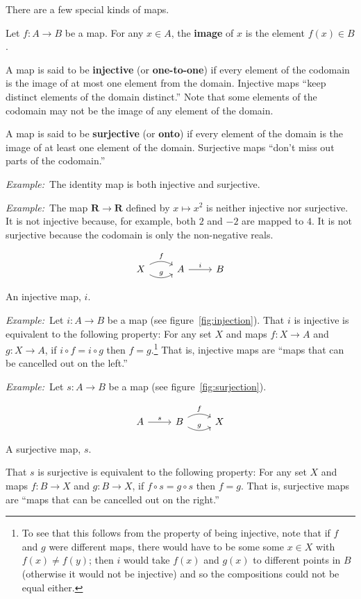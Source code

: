\documentclass[12pt, a4paper]{article}
\newcommand{\defn}[1]{\textbf{#1}}
\newcommand{\set}[1]{\mathbold{#1}}
\newcommand{\eg}{\emph{Example:}\relax}
\begin{document}
There are a few special kinds of maps. 
 
Let $f:A\to B$ be a map. For any $x\in A$, the \defn{image} of $x$ is the
element $f(x)\in B$.

A map is said to be \defn{injective} (or \defn{one-to-one}) if every
element of the codomain is the image of at most one element from the
domain. Injective maps “keep distinct elements of the domain
distinct.” Note that some elements of the codomain may not be the
image of any element of the domain.

A map is said to be \defn{surjective} (or \defn{onto}) if every
element of the domain is the image of at least one element of the
domain. Surjective maps “don't miss out parts of the codomain.”

\eg\ The identity map is both injective and surjective.

\eg\ The map $\set{R}\to\set{R}$ defined by $x\mapsto x^2$ is neither
injective nor surjective. It is not injective because, for example,
both $2$ and $-2$ are mapped to $4$. It is not surjective because the
codomain is only the non-negative reals.

\begin{sidefigure}
\[\begin{tikzcd}
  X \arrow[r, bend left, "f"] \arrow [r, bend right, "g"] & A \arrow[r, "i"] & B
\end{tikzcd}\]
  \caption{An injective map, $i$.\label{fig:injection}}
\end{sidefigure}
\eg\ Let $i\colon A\to B$ be a map (see
figure~\ref{fig:injection}). That $i$ is injective is equivalent to
the following property: For any set $X$ and maps $f\colon X\to A$ and
$g\colon X\to A$, if $i\circ f = i\circ g$ then $f = g$.\footnote{To see that
this follows from the property of being injective, note that if $f$
and $g$ were different maps, there would have to be some some $x \in X$
with $f(x)\neq f(y)$; then $i$ would take $f(x)$ and $g(x)$ to different
points in $B$ (otherwise it would not be injective) and so the
compositions could not be equal either.} That is, injective maps are
“maps that can be cancelled out on the left.”

\eg\ Let $s\colon A\to B$ be a map (see
figure~\ref{fig:surjection}).
\begin{sidefigure}
\[\begin{tikzcd}
  A \arrow[r, "s"] & B \arrow[r, bend left, "f"] \arrow [r, bend right, "g"] & X 
\end{tikzcd}\]
  \caption{A surjective map, $s$.\label{fig:surjection}}
\end{sidefigure}
That $s$ is surjective is equivalent to
the following property: For any set $X$ and maps $f\colon B\to X$ and
$g\colon B\to X$, if $f\circ s = g\circ s$ then $f = g$. That is, surjective
maps are “maps that can be cancelled out on the right.”
\end{document}
